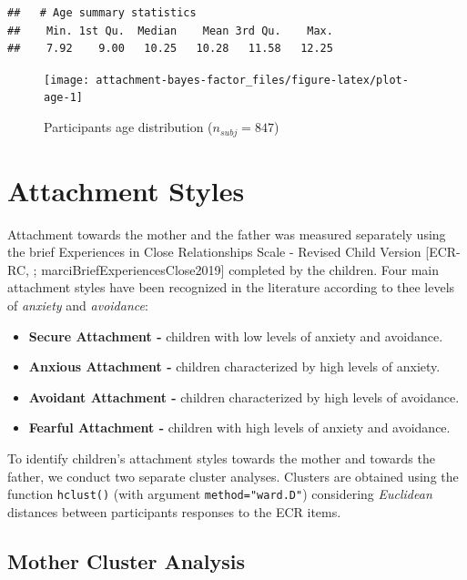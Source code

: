 \documentclass[
]{book}
\providecommand{\tightlist}{%
  \setlength{\itemsep}{0pt}\setlength{\parskip}{0pt}}
\begin{document}
\begin{verbatim}
##   # Age summary statistics
##    Min. 1st Qu.  Median    Mean 3rd Qu.    Max. 
##    7.92    9.00   10.25   10.28   11.58   12.25
\end{verbatim}

\begin{figure}

{\centering \texttt{[image: attachment-bayes-factor\_files/figure-latex/plot-age-1]} 

}

\caption{Participants age distribution ($n_{subj} = 847$)}\label{fig:plot-age}
\end{figure}

\hypertarget{attachment-styles}{%
\section{Attachment Styles}\label{attachment-styles}}

Attachment towards the mother and the father was measured separately using the brief Experiences in Close Relationships Scale - Revised Child Version {[}ECR-RC, \citet{Brenning2014ThePQ}; marciBriefExperiencesClose2019{]} completed by the children. Four main attachment styles have been recognized in the literature according to thee levels of \emph{anxiety} and \emph{avoidance}:

\begin{itemize}
\tightlist
\item
  \textbf{Secure Attachment -} children with low levels of anxiety and avoidance.
\item
  \textbf{Anxious Attachment -} children characterized by high levels of anxiety.
\item
  \textbf{Avoidant Attachment -} children characterized by high levels of avoidance.
\item
  \textbf{Fearful Attachment -} children with high levels of anxiety and avoidance.
\end{itemize}

To identify children's attachment styles towards the mother and towards the father, we conduct two separate cluster analyses. Clusters are obtained using the function \texttt{hclust()} (with argument \texttt{method="ward.D"}) considering \emph{Euclidean} distances between participants responses to the ECR items.

\hypertarget{mother-cluster-analysis}{%
\subsection{Mother Cluster Analysis}\label{mother-cluster-analysis}}
\end{document}
